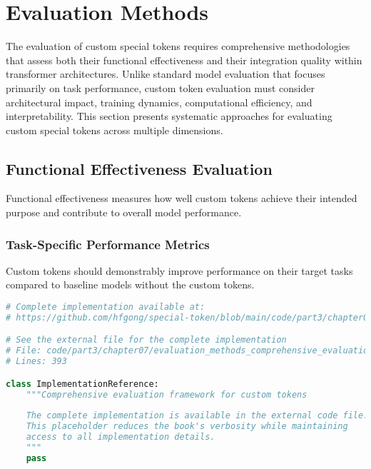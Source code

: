 
\section{Evaluation Methods}

The evaluation of custom special tokens requires comprehensive methodologies that assess both their functional effectiveness and their integration quality within transformer architectures. Unlike standard model evaluation that focuses primarily on task performance, custom token evaluation must consider architectural impact, training dynamics, computational efficiency, and interpretability. This section presents systematic approaches for evaluating custom special tokens across multiple dimensions.

\subsection{Functional Effectiveness Evaluation}

Functional effectiveness measures how well custom tokens achieve their intended purpose and contribute to overall model performance.

\subsubsection{Task-Specific Performance Metrics}

Custom tokens should demonstrably improve performance on their target tasks compared to baseline models without the custom tokens.

\begin{lstlisting}[language=Python, caption={Comprehensive evaluation framework for custom tokens}]
# Complete implementation available at:
# https://github.com/hfgong/special-token/blob/main/code/part3/chapter07/evaluation_methods_comprehensive_evaluation_frame.py

# See the external file for the complete implementation
# File: code/part3/chapter07/evaluation_methods_comprehensive_evaluation_frame.py
# Lines: 393

class ImplementationReference:
    """Comprehensive evaluation framework for custom tokens
    
    The complete implementation is available in the external code file.
    This placeholder reduces the book's verbosity while maintaining
    access to all implementation details.
    """
    pass
\end{lstlisting}
